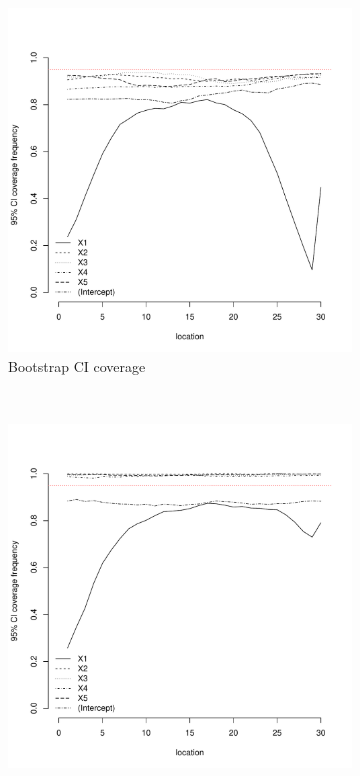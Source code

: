 \documentclass[authoryear, review, 11pt]{elsarticle}
\begin{document}
\begin{figure}
	\vspace{-30mm}
	\centering
	\begin{subfigure}[b]{0.45\textwidth}
	\centering
		\includegraphics[width=\textwidth]{../../figures/simulation/15.8.profile_bootstrap_coverage.pdf}
		\caption{Bootstrap CI coverage}
	\end{subfigure}%
	~ %
	\begin{subfigure}[b]{0.45\textwidth}
	\centering
		\includegraphics[width=\textwidth]{../../figures/simulation/15.8.profile_se_coverage.pdf}

\end{subfigure}
\end{figure}
\end{document}

